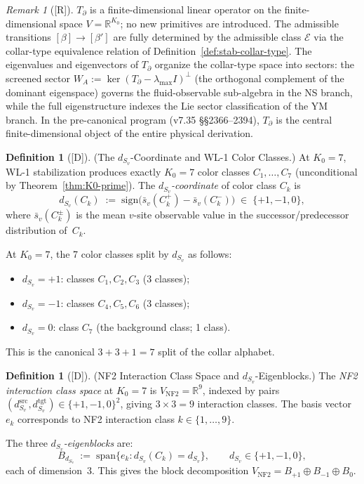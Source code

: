 \documentclass[12pt,oneside]{amsbook}
\theoremstyle{plain}
\theoremstyle{definition}
\newtheorem{definition}[theorem]{Definition}
\theoremstyle{remark}
\newtheorem{remark}[theorem]{Remark}
\newcommand{\status}[1]{\textup{[#1]}}
\begin{document}
\begin{remark}[\status{R}]
$T_\partial$ is a finite-dimensional linear operator on the
finite-dimensional space $V = \mathbb{R}^{K_0}$; no new primitives
are introduced.  The admissible transitions $[\beta]\to[\beta']$
are fully determined by the admissible class $\mathcal{E}$ via the
collar-type equivalence relation of Definition~\ref{def:stab-collar-type}.
The eigenvalues and eigenvectors of $T_\partial$ organize the
collar-type space into sectors: the screened sector
$W_A := \ker(T_\partial - \lambda_{\max}I)^{\perp}$ (the orthogonal
complement of the dominant eigenspace) governs the fluid-observable
sub-algebra in the NS branch, while the full eigenstructure indexes
the Lie sector classification of the YM branch.  In the pre-canonical
program (v7.35 \S\S2366--2394), $T_\partial$ is the central
finite-dimensional object of the entire physical derivation.
\end{remark}


\begin{definition}[\status{D}]\label{def:dsv-coord}
\textup{(The $d_{S_v}$-Coordinate and WL-1 Color Classes.)}
At $K_0=7$, WL-1 stabilization produces exactly $K_0=7$ color
classes $C_1,\ldots,C_7$ (unconditional by
Theorem~\ref{thm:K0-prime}).  The \emph{$d_{S_v}$-coordinate} of
color class $C_k$ is
\[
  d_{S_v}(C_k) \;:=\; \mathrm{sign}\!\bigl(\bar{s}_v(C_k^+)
  - \bar{s}_v(C_k^-)\bigr) \;\in\; \{+1,-1,0\},
\]
where $\bar{s}_v(C_k^\pm)$ is the mean $v$-site observable value
in the successor/predecessor distribution of~$C_k$.

At $K_0=7$, the 7 color classes split by $d_{S_v}$ as follows:
\begin{itemize}
  \item $d_{S_v}=+1$: classes $C_1,C_2,C_3$ (3 classes);
  \item $d_{S_v}=-1$: classes $C_4,C_5,C_6$ (3 classes);
  \item $d_{S_v}=0$: class $C_7$ (the background class; 1 class).
\end{itemize}
This is the canonical $3+3+1 = 7$ split of the collar alphabet.
\end{definition}

\begin{definition}[\status{D}]\label{def:NF2-blocks}
\textup{(NF2 Interaction Class Space and $d_{S_v}$-Eigenblocks.)}
The \emph{NF2 interaction class space} at $K_0=7$ is
$V_{\mathrm{NF2}} = \mathbb{R}^9$, indexed by pairs
$(d_{S_v}^{\mathrm{src}}, d_{S_v}^{\mathrm{tgt}})
\in \{+1,-1,0\}^2$, giving $3\times 3=9$ interaction classes.
The basis vector $e_k$ corresponds to NF2 interaction class
$k\in\{1,\ldots,9\}$.

The three \emph{$d_{S_v}$-eigenblocks} are:
\[
  B_{d_{S_v}} \;:=\; \mathrm{span}\{e_k : d_{S_v}(C_k)=d_{S_v}\},
  \qquad d_{S_v}\in\{+1,-1,0\},
\]
each of dimension~$3$.  This gives the block decomposition
$V_{\mathrm{NF2}} = B_{+1} \oplus B_{-1} \oplus B_0$.
\end{definition}
\end{document}
